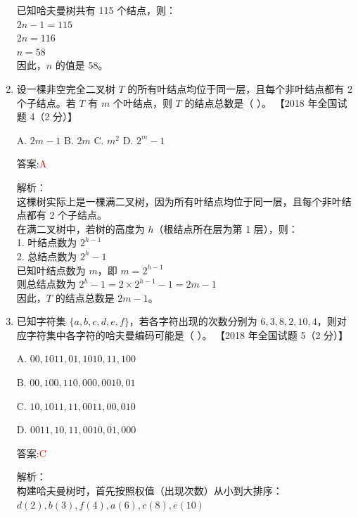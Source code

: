 \documentclass[lang=cn,newtx,10pt,scheme=chinese]{../../../elegantbook}
\begin{document}
\begin{enumerate}
        已知哈夫曼树共有 115 个结点，则：\\
        $2n-1 = 115$\\
        $2n = 116$\\
        $n = 58$\\
        
        因此，$n$ 的值是 58。\\
    
        \item 设一棵非空完全二叉树 $T$ 的所有叶结点均位于同一层，且每个非叶结点都有 2 个子结点。若 $T$ 有 $m$ 个叶结点，则 $T$ 的结点总数是（ ）。  
        【2018 年全国试题 4（2 分）】
    
        A. $2m - 1$ \quad B. $2m$ \quad C. $m^2$ \quad D. $2^{m} - 1$  
    
        答案:\textcolor{red}{A}
        
        解析：\\
        这棵树实际上是一棵满二叉树，因为所有叶结点均位于同一层，且每个非叶结点都有 2 个子结点。\\
        
        在满二叉树中，若树的高度为 $h$（根结点所在层为第 1 层），则：\\
        1. 叶结点数为 $2^{h-1}$\\
        2. 总结点数为 $2^h - 1$\\
        
        已知叶结点数为 $m$，即 $m = 2^{h-1}$\\
        则总结点数为 $2^h - 1 = 2 \times 2^{h-1} - 1 = 2m - 1$\\
        
        因此，$T$ 的结点总数是 $2m - 1$。\\
    
        \item 已知字符集 $\{a, b, c, d, e, f\}$，若各字符出现的次数分别为 $6, 3, 8, 2, 10, 4$，则对应字符集中各字符的哈夫曼编码可能是（ ）。  
        【2018 年全国试题 5（2 分）】  
    
        A. $00, 1011, 01, 1010, 11, 100$  
    
        B. $00, 100, 110, 000, 0010, 01$  
    
        C. $10, 1011, 11, 0011, 00, 010$  
    
        D. $0011, 10, 11, 0010, 01, 000$  
    
        答案:\textcolor{red}{C}
        
        解析：\\
        构建哈夫曼树时，首先按照权值（出现次数）从小到大排序：$d(2), b(3), f(4), a(6), c(8), e(10)$\\
        

\end{enumerate}
\end{document}
